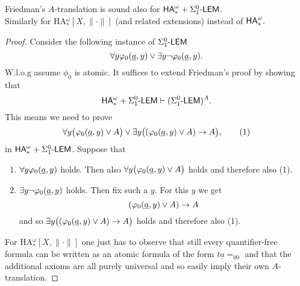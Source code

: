 \begin{lemma}\label{l:Atrans+}
Friedman's $A$-translation is sound also for ${\textsf{\upshape HA}}^\omega_* + \Sigma^0_1\textsf{\upshape -LEM}$.\\ Similarly for 
{\rm HA$_*^{\omega}[X,\|\cdot\|]$} (and related extensions) instead of 
${\textsf{\upshape HA}}^\omega_*.$
\end{lemma}
\begin{proof}
Consider the following instance of $\Sigma^0_1\textsf{\upshape -LEM}$
\[\forall y \varphi_0(\underline a,y)  \vee \exists y \neg\varphi_0(\underline a,y).\] 
W.l.o.g assume $\phi_0$ is atomic. 
It suffices to extend Friedman's proof by showing that
\[{\textsf{\upshape HA}}^\omega_* + \Sigma^0_1\textsf{\upshape -LEM}\vdash (\Sigma^0_1\textsf{\upshape -LEM})^A.\]
This means we need to prove
\[ \forall y \big( \varphi_0(\underline a,y) \vee A\big) \vee \exists y \big(  (\varphi_0(\underline a,y) \vee A) \rightarrow A\big),\tag{1}\]
in ${\textsf{\upshape HA}}^\omega_* + \Sigma^0_1\textsf{\upshape -LEM}$.
Suppose that
\begin{enumerate}
\item $\forall y \varphi_0(\underline a,y)$ holds. Then also $\forall y \big( \varphi_0(\underline a,y) \vee A\big)$ holds and therefore also (1).
\item $\exists y \neg\varphi_0(\underline a,y)$ holds. Then fix such a $y$. For this $y$ we get 
\[(\varphi_0(\underline a,y) \vee A) \rightarrow A\]
and so $ \exists y \big(  (\varphi_0(\underline a,y) \vee A) \rightarrow A\big)$ holds and therefore also (1). 
\end{enumerate}
For HA$_*^{\omega}[X,\|\cdot\|]$ one just has to observe that still every 
quantifier-free formula can be written as an atomic formula of the form 
$t\underline{a}=_00$ and that the additional axioms are all purely universal 
and so easily imply their own $A$-translation.  
\end{proof}


